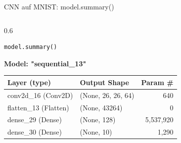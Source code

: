\begin{frame}[fragile]{CNN auf MNIST: model.summary()}
\begin{columns}
\begin{column}{0.6\textwidth}
\begin{verbatim}
model.summary()
\end{verbatim}
\vspace{0.5em}

{\ttfamily\footnotesize
{}
\noindent\textbf{Model: "sequential\_13"}

\vspace{0.3em}
\setlength{\arrayrulewidth}{0.5pt}
\renewcommand{\arraystretch}{1.3}
\begin{tabular}{|l|l|r|}
\hline
\textbf{Layer (type)} & \textbf{Output Shape} & \textbf{Param \#}\\
\hline
conv2d\_16 (\textcolor{jupytertype}{Conv2D}) & (\textcolor{jupytertype}{None}, \textcolor{jupyternum}{26}, \textcolor{jupyternum}{26}, \textcolor{jupyternum}{64}) & \textcolor{jupyternum}{640}\\
\hline
flatten\_13 (\textcolor{jupytertype}{Flatten}) & (\textcolor{jupytertype}{None}, \textcolor{jupyternum}{43264}) & \textcolor{jupyternum}{0}\\
\hline
dense\_29 (\textcolor{jupytertype}{Dense}) & (\textcolor{jupytertype}{None}, \textcolor{jupyternum}{128}) & \textcolor{jupyternum}{5,537,920}\\
\hline
dense\_30 (\textcolor{jupytertype}{Dense}) & (\textcolor{jupytertype}{None}, \textcolor{jupyternum}{10}) & \textcolor{jupyternum}{1,290}\\
\hline
\end{tabular}

}
\end{column}
\end{columns}
\end{frame}
